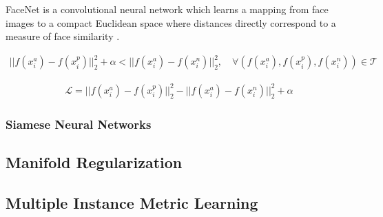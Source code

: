 		FaceNet is a convolutional neural network which learns a mapping from face images to a compact Euclidean space where distances directly correspond to a measure of face similarity \cite{Schroff2015FaceNet}. 
		
		\begin{align}
			||f(x^{a}_{i}) - f(x^{p}_{i})||^{2}_{2} + \alpha < ||f(x^{a}_{i}) - f(x^{n}_{i})||^{2}_{2}, \quad \forall (f(x^{a}_{i}),f(x^{p}_{i}),f(x^{n}_{i})) \in \mathcal{T}
		\end{align} 
	
		\begin{align}
			\mathcal{L} = ||f(x^{a}_{i}) - f(x^{p}_{i})||^{2}_{2} -||f(x^{a}_{i}) - f(x^{n}_{i})||^{2}_{2} + \alpha
		\end{align}
		
		
		\subsubsection{Siamese Neural Networks}
	
	\subsection{Manifold Regularization}
	
	\subsection{Multiple Instance Metric Learning}





